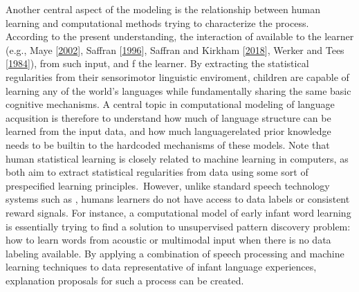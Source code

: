 \documentclass[letterpaper,10pt,english]{jupyterBook}
\begin{document}
\sphinxAtStartPar
Another central aspect of the modeling is the relationship between human
learning and computational methods trying to characterize the process.
According to the present understanding,  the interaction of  available to the learner (e.g., Maye  {[}\hyperlink{cite.References:id24}{2002}{]}, Saffran  {[}\hyperlink{cite.References:id16}{1996}{]}, Saffran and Kirkham {[}\hyperlink{cite.References:id15}{2018}{]}, Werker and Tees {[}\hyperlink{cite.References:id11}{1984}{]}),
from such input, and  f the learner. By extracting the
statistical regularities from their sensorimotor linguistic enviroment,
children are capable of learning any of the world’s languages while
fundamentally sharing the same basic cognitive mechanisms. A central
topic in computational modeling of language acqusition is therefore to
understand how much of language structure can be learned from the input
data, and how much language\sphinxhyphen{}related prior knowledge needs to be built\sphinxhyphen{}in
to the hard\sphinxhyphen{}coded mechanisms of these models. Note that human
statistical learning is closely related to machine learning in
computers, as both aim to extract statistical regularities from data
using some sort of pre\sphinxhyphen{}specified learning principles. However, unlike
standard speech technology systems such as {\hyperref[\detokenize{Recognition/Speech_Recognition::doc}]{}}, humans learners do not have access to
data labels or consistent reward signals. For instance, a computational
model of early infant word learning is essentially trying to find a
solution to unsupervised pattern discovery problem: how to learn words
from acoustic or multimodal input when there is no data labeling
available. By applying a combination of speech processing and machine
learning techniques to data representative of infant language
experiences, explanation proposals for such a process can be created.
\end{document}
